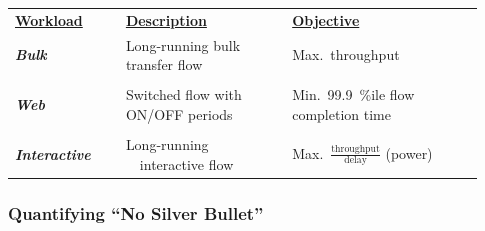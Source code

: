 \begin{Large}
\begin{frame}[plain]
\begin{table}
\begin{tabular}{|p{0.22\linewidth}|p{0.33\linewidth}|p{0.38\linewidth}|}
\hline
{\bf \underline{Workload}} & {\bf \underline{Description}} & {\bf \underline{Objective}} \\
\textbf{\emph{Bulk}} & Long-running bulk transfer flow & Max.~throughput \\
& &\\
\textbf{\emph{Web}} & Switched flow with ON/OFF periods &
Min.~99.9~\%ile flow completion time \\
& &\\
\textbf{\emph{Interactive}} & Long-running \ \  interactive flow & Max.~$\frac{\mbox{throughput}}{\mbox{delay}}$ (power) \\ 
\hline
\end{tabular}
\end{table}
\end{frame}

\begin{frame}[plain]
\frametitle{Quantifying ``No Silver Bullet''}



\end{frame}
\end{Large}
